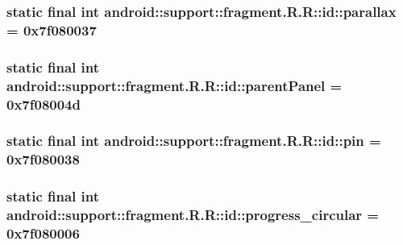 \hypertarget{classandroid_1_1support_1_1fragment_1_1_r_1_1id_f5567d4bc105aa3e23781a38087a1f48}{
\subsubsection[{parallax}]{\setlength{\rightskip}{0pt plus 5cm}static final int android::support::fragment.R.R::id::parallax = 0x7f080037}}
\label{classandroid_1_1support_1_1fragment_1_1_r_1_1id_f5567d4bc105aa3e23781a38087a1f48}


\hypertarget{classandroid_1_1support_1_1fragment_1_1_r_1_1id_13515000f400df14e56afdfabc4854e4}{
\subsubsection[{parentPanel}]{\setlength{\rightskip}{0pt plus 5cm}static final int android::support::fragment.R.R::id::parentPanel = 0x7f08004d}}
\label{classandroid_1_1support_1_1fragment_1_1_r_1_1id_13515000f400df14e56afdfabc4854e4}


\hypertarget{classandroid_1_1support_1_1fragment_1_1_r_1_1id_a9205004967f65111e4d69e98d12eca3}{
\subsubsection[{pin}]{\setlength{\rightskip}{0pt plus 5cm}static final int android::support::fragment.R.R::id::pin = 0x7f080038}}
\label{classandroid_1_1support_1_1fragment_1_1_r_1_1id_a9205004967f65111e4d69e98d12eca3}


\hypertarget{classandroid_1_1support_1_1fragment_1_1_r_1_1id_ac2d31845c5c417ff4c67b30cf61a922}{
\subsubsection[{progress\_\-circular}]{\setlength{\rightskip}{0pt plus 5cm}static final int android::support::fragment.R.R::id::progress\_\-circular = 0x7f080006}}
\label{classandroid_1_1support_1_1fragment_1_1_r_1_1id_ac2d31845c5c417ff4c67b30cf61a922}


